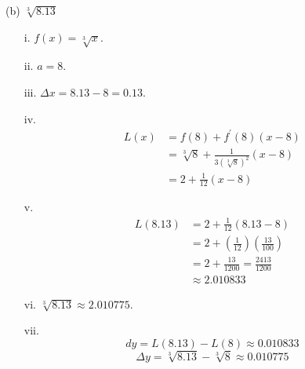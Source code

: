\documentclass[handout,nooutcomes]{ximera}
\begin{document}
\begin{problem}
\begin{freeResponse}
		(b)  $ \sqrt[3]{8.13}$
			\begin{enumerate}
			\item[i.]  $f(x) = \sqrt[3]{x}$.
			\item[ii.]  $a=8$.
			\item[iii.]  $\Delta x = 8.13 - 8 = 0.13$.
			\item[iv.]  
				\begin{align*}
				L(x) &= f(8) + f^\prime (8) (x-8) \\
				&= \sqrt[3]{8} + \frac{1}{3 (\sqrt[3]{8})^2} \left( x - 8 \right) \\
				&= 2 + \frac{1}{12} (x-8) 
				\end{align*}
			\item[v.]  
				\begin{align*}
				L(8.13) &= 2 + \frac{1}{12} (8.13 - 8) \\
				&= 2 + \left( \frac{1}{12} \right) \left( \frac{13}{100} \right) \\
				&= 2 + \frac{13}{1200} = \frac{2413}{1200} \\
				&\approx 2.010833
				\end{align*}
			\item[vi.]  $\sqrt[3]{8.13} \approx 2.010775$.
			\item[vii.]  
			$$ dy = L(8.13) - L(8) \approx 0.010833 $$
			$$ \Delta y = \sqrt[3]{8.13} - \sqrt[3]{8} \approx 0.010775 $$
			\end{enumerate}
		\end{freeResponse}
		
		
\end{problem}







\newpage
\end{document}

